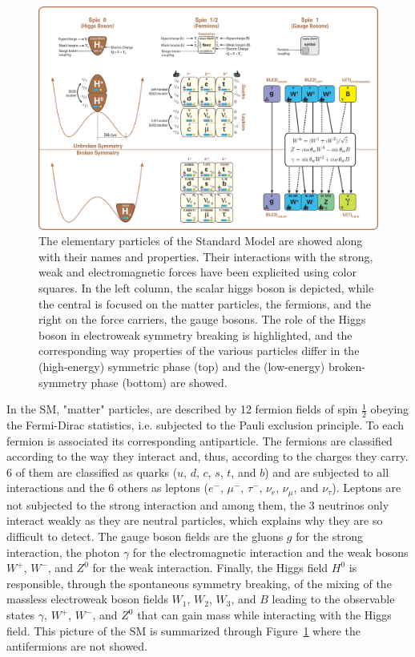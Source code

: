 	\begin{figure}[H]
		\centering
		\hspace*{-0.1\linewidth}
		\includegraphics[width=1.2\linewidth]{fig/chapt2/Standard_Model_Of_Particle_Physics.png}
		\caption{\label{fig:SM} The elementary particles of the Standard Model are showed along with their names and properties. Their interactions with the strong, weak and electromagnetic forces have been explicited using color squares. In the left column, the scalar higgs boson is depicted, while the central is focused on the matter particles, the fermions, and the right on the force carriers, the gauge bosons. The role of the Higgs boson in electroweak symmetry breaking is highlighted, and the corresponding way properties of the various particles differ in the (high-energy) symmetric phase (top) and the (low-energy) broken-symmetry phase (bottom) are showed.}
	\end{figure}
	
	In the SM, "matter" particles, are described by 12 fermion fields of spin $\frac{1}{2}$ obeying the Fermi-Dirac statistics, i.e. subjected to the Pauli exclusion principle. To each fermion is associated its corresponding antiparticle. The fermions are classified according to the way they interact and, thus, according to the charges they carry. 6 of them are classified as quarks ($u$, $d$, $c$, $s$, $t$, and $b$) and are subjected to all interactions and the 6 others as leptons ($e^-$, $\mu^-$, $\tau^-$, $\nu_e$, $\nu_\mu$, and $\nu_\tau$). Leptons are not subjected to the strong interaction and among them, the 3 neutrinos only interact weakly as they are neutral particles, which explains why they are so difficult to detect. The gauge boson fields are the gluons $g$ for the strong interaction, the photon $\gamma$ for the electromagnetic interaction and the weak bosons $W^+$, $W^-$, and $Z^0$ for the weak interaction. Finally, the Higgs field $H^0$ is responsible, through the spontaneous symmetry breaking, of the mixing of the massless electroweak boson fields $W_1$, $W_2$, $W_3$, and $B$ leading to the observable states $\gamma$, $W^+$, $W^-$, and $Z^0$ that can gain mass while interacting with the Higgs field. This picture of the SM is summarized through Figure~\ref{fig:SM} where the antifermions are not showed.
	
